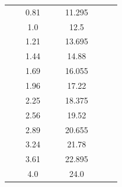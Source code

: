 \documentclass[a4paper,12pt]{article}
\begin{document}
\begin{table}[h]
\begin{tabular}{|c|c|c|c|c|c|c|c|c|}
			&                          & 0.81           &                          &                         & 11.295        &                           &                        &                        \\ \cline{3-3} \cline{6-6}
			&                          & 1.0            &                          &                         & 12.5          &                           &                        &                        \\ \cline{3-3} \cline{6-6}
			&                          & 1.21           &                          &                         & 13.695        &                           &                        &                        \\ \cline{3-3} \cline{6-6}
			&                          & 1.44           &                          &                         & 14.88         &                           &                        &                        \\ \cline{3-3} \cline{6-6}
			&                          & 1.69           &                          &                         & 16.055        &                           &                        &                        \\ \cline{3-3} \cline{6-6}
			&                          & 1.96           &                          &                         & 17.22         &                           &                        &                        \\ \cline{3-3} \cline{6-6}
			&                          & 2.25           &                          &                         & 18.375        &                           &                        &                        \\ \cline{3-3} \cline{6-6}
			&                          & 2.56           &                          &                         & 19.52         &                           &                        &                        \\ \cline{3-3} \cline{6-6}
			&                          & 2.89           &                          &                         & 20.655        &                           &                        &                        \\ \cline{3-3} \cline{6-6}
			&                          & 3.24           &                          &                         & 21.78         &                           &                        &                        \\ \cline{3-3} \cline{6-6}
			&                          & 3.61           &                          &                         & 22.895        &                           &                        &                        \\ \cline{3-3} \cline{6-6}
			&                          & 4.0            &                          &                         & 24.0          &                           &                        &                        \\ \hline
		\end{tabular}
	\end{table}
\end{document}
